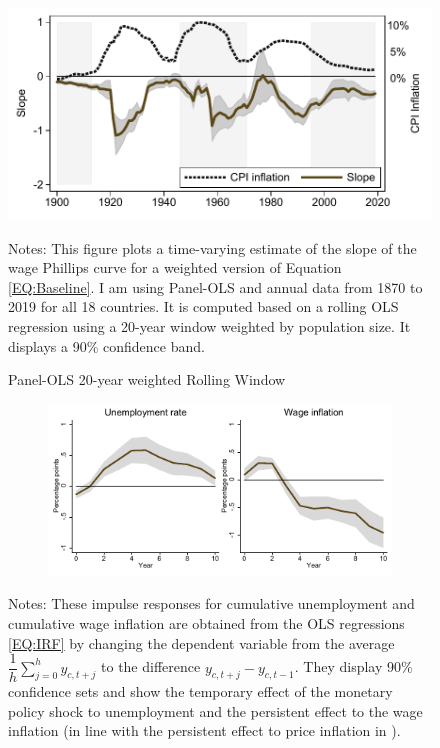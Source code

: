 \documentclass[12pt]{article}
\newcommand{\annote}[1]{\parbox{\textwidth}{\renewcommand{\baselinestretch}{1.0}\vspace{12pt} \footnotesize Notes: #1}}
\begin{document}
\begin{appendices}
\begin{singlespace}
\begin{figure}[h!]
    \centering
    \caption{Panel-OLS 20-year weighted Rolling Window}
    \includegraphics[scale=0.9]{../Output/Figures/Figure_A4}
    \annote{\footnotesize This figure plots a time-varying estimate of the slope of the wage Phillips curve for a weighted version of Equation \eqref{EQ:Baseline}. I am using Panel-OLS and annual data from 1870 to 2019 for all 18 countries. It is computed based on a rolling OLS regression using a 20-year window weighted by population size. It displays a 90\% confidence band.}
    \label{F:RWIV3}
\end{figure}

\begin{figure}[h!]
    \centering
    \caption{Impulse Responses of Cumulative Changes in Unemployment and Wage Inflation}
	\label{F:Non_Avg_Response}
	\begin{subfigure}[b]{0.75\textwidth}
		\includegraphics[width=\textwidth]{../Output/Figures/Figure_A5.pdf}
	\end{subfigure}
\annote{These impulse responses for cumulative unemployment and cumulative wage inflation are obtained from the OLS regressions \eqref{EQ:IRF} by changing the dependent variable from the average $\dfrac{1}{h} \sum^h_{j=0} y_{c,t+j}$ to the difference $y_{c,t+j}-y_{c,t-1}$. They display 90\% confidence sets and show the temporary effect of the monetary policy shock to unemployment and the persistent effect to the wage inflation (in line with the persistent effect to price inflation in \cite{Jorda2019}).}
\end{figure}


\end{singlespace}
\end{appendices}
\end{document}
